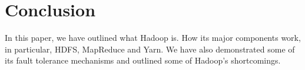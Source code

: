 \section{Conclusion}

In this paper, we have outlined what Hadoop is. How its major components work, in particular, HDFS, MapReduce and Yarn. We have also demonstrated some of its fault tolerance mechanisms and outlined some of Hadoop's shortcomings.